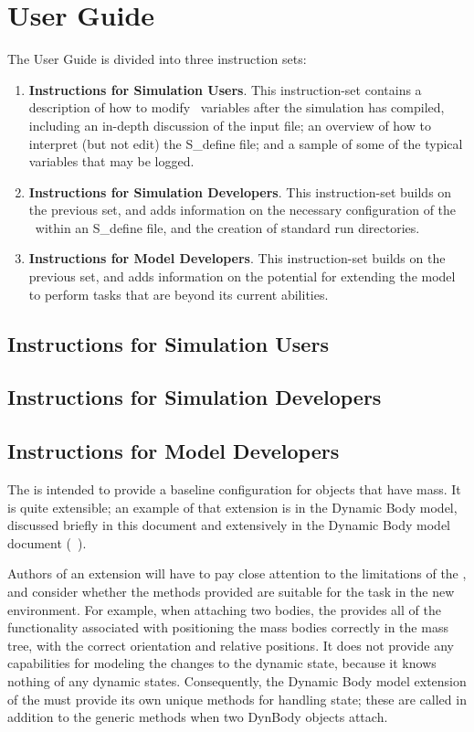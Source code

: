 \chapter{User Guide}\label{ch:user}
The User Guide is divided into three instruction sets:
\begin{enumerate}
 \item \textbf{Instructions for Simulation Users}.  This instruction-set 
 contains a description of how to modify \ModelDesc\ variables after the 
 simulation has compiled, including an in-depth discussion of the input file; 
 an overview of how to interpret (but not edit) the S\_define file; and a 
 sample of some of the typical variables that may be logged.
 \item \textbf{Instructions for Simulation Developers}.  This instruction-set 
 builds on the previous set, and adds information on the necessary 
 configuration of the \ModelDesc\ within an S\_define file, and the creation of 
 standard run directories.
 \item \textbf{Instructions for Model Developers}.   This instruction-set 
 builds on the previous set, and adds information on the potential for 
 extending the model to perform tasks that are beyond its current abilities.
\end{enumerate}

\section{Instructions for Simulation Users}\label{sec:guide_sim_user}

\section{Instructions for Simulation Developers}

\section{Instructions for Model Developers}

The \ModelDesc is intended to provide a baseline configuration for objects that 
have mass.  It is quite extensible; an example of that extension is in the 
Dynamic Body model, discussed briefly in this document and extensively in the 
Dynamic Body model document (~\cite{dynenv:DYNBODY}).

Authors of an extension will have to pay close attention to the limitations of 
the \ModelDesc, and consider whether the methods provided are suitable for the 
task in the new environment.  For example, when attaching two bodies, the 
\ModelDesc provides all of the functionality associated with positioning the 
mass bodies correctly in the mass tree, with the correct orientation and 
relative positions.  It does not provide any capabilities for modeling the 
changes to the dynamic state, because it knows nothing of any dynamic states.  
Consequently, the Dynamic Body model extension of the \ModelDesc must provide 
its own unique methods for handling state; these are called in addition to the 
generic \ModelDesc methods when two DynBody objects attach.